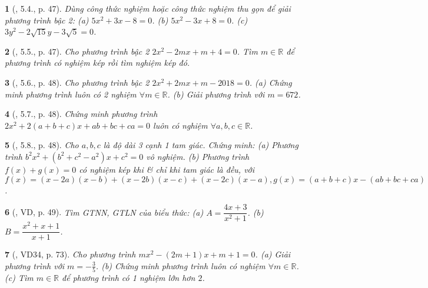 \documentclass{article}
\newtheorem{baitoan}{}
\begin{document}
\begin{baitoan}[\cite{Binh_boi_duong_Toan_9_tap_2}, 5.4., p. 47]
	Dùng công thức nghiệm hoặc công thức nghiệm thu gọn để giải phương trình bậc 2: (a) $5x^2 + 3x - 8 = 0$. (b) $5x^2 - 3x + 8 = 0$. (c) $3y^2 - 2\sqrt{15}y - 3\sqrt{5} = 0$.
\end{baitoan}

\begin{baitoan}[\cite{Binh_boi_duong_Toan_9_tap_2}, 5.5., p. 47]
	Cho phương trình bậc 2 $2x^2 - 2mx + m + 4 = 0$. Tìm $m\in\mathbb{R}$ để phương trình có nghiệm kép rồi tìm nghiệm kép đó.
\end{baitoan}

\begin{baitoan}[\cite{Binh_boi_duong_Toan_9_tap_2}, 5.6., p. 48]
	Cho phương trình bậc 2 $2x^2 + 2mx + m - 2018 = 0$. (a) Chứng minh phương trình luôn có 2 nghiệm $\forall m\in\mathbb{R}$. (b) Giải phương trình với $m = 672$.
\end{baitoan}

\begin{baitoan}[\cite{Binh_boi_duong_Toan_9_tap_2}, 5.7., p. 48]
	Chứng minh phương trình $2x^2 + 2(a + b + c)x + ab + bc + ca = 0$ luôn có nghiệm $\forall a,b,c\in\mathbb{R}$.
\end{baitoan}

\begin{baitoan}[\cite{Binh_boi_duong_Toan_9_tap_2}, 5.8., p. 48]
	Cho $a,b,c$ là độ dài 3 cạnh 1 tam giác. Chứng minh: (a) Phương trình $b^2x^2 + (b^2 + c^2 - a^2)x + c^2 = 0$ vô nghiệm. (b) Phương trình $f(x) + g(x) = 0$ có nghiệm kép khi \& chỉ khi tam giác là đều, với $f(x) = (x - 2a)(x - b) + (x - 2b)(x - c) + (x - 2c)(x - a),g(x) = (a + b + c)x - (ab + bc + ca)$.
\end{baitoan}

\begin{baitoan}[\cite{Binh_boi_duong_Toan_9_tap_2}, VD, p. 49]
	Tìm {\rm GTNN, GTLN} của biểu thức: (a) $A = \dfrac{4x + 3}{x^2 + 1}$. (b) $B = \dfrac{x^2 + x + 1}{x + 1}$.
\end{baitoan}

\begin{baitoan}[\cite{Tuyen_Toan_9_old}, VD34, p. 73]
	Cho phương trình $mx^2 - (2m + 1)x + m + 1 = 0$. (a) Giải phương trình với $m = -\frac{3}{5}$. (b) Chứng minh phương trình luôn có nghiệm $\forall m\in\mathbb{R}$. (c) Tìm $m\in\mathbb{R}$ để phương trình có 1 nghiệm lớn hơn $2$.
\end{baitoan}
\end{document}
